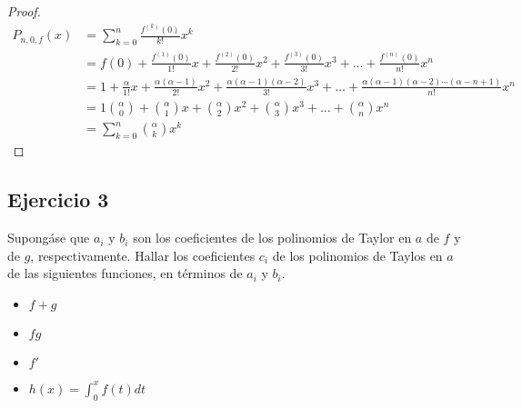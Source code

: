 \documentclass[a4paper]{article}
\begin{document}
\begin{proof}
\begin{align*}
        P_{n, 0, f}(x) &= \sum_{k = 0}^{n} \frac{f^{(k)}(0)}{k!}x^k \\
        &= f(0) + \frac{f^{(1)}(0)}{1!}x + \frac{f^{(2)}(0)}{2!}x^2 + \frac{f^{(3)}(0)}{3!}x^3 + \dotsc + \frac{f^{(n)}(0)}{n!}x^n \\
        &= 1 + \frac{\alpha}{1!}x + \frac{\alpha\left(\alpha - 1\right)}{2!}x^2 + \frac{\alpha\left(\alpha - 1\right)\left(\alpha - 2\right)}{3!}x^3 + \dotsc + \frac{\alpha\left(\alpha - 1\right)\left(\alpha - 2\right) \cdots \left(\alpha - n + 1\right)}{n!}x^n \\
        &= 1\binom{\alpha}{0} + \binom{\alpha}{1}x + \binom{\alpha}{2}x^2 + \binom{\alpha}{3}x^3 + \dotsc + \binom{\alpha}{n}x^n \\
        &= \sum_{k = 0}^{n} \binom{\alpha}{k}x^{k}
    \end{align*}
\end{proof}
\newpage
\subsection{Ejercicio 3}
\noindent
Supongáse que \(a_{i}\) y \(b_{i}\) son los coeficientes de los polinomios de Taylor en \(a\) de \(f\)
y de \(g\), respectivamente. Hallar los coeficientes \(c_{i}\) de los polinomios de Taylos en \(a\)
de las siguientes funciones, en términos de \(a_{i}\) y \(b_{i}\).
\begin{itemize}
    \item \(f + g\)
    \item \(fg\)
    \item \(f'\)
    \item \(h(x) = \displaystyle \int_{0}^{x} f(t) dt\)
\end{itemize}
\end{document}
